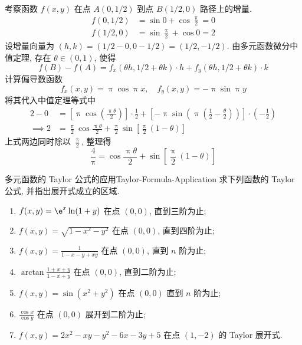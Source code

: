 \begin{myproof}
    考察函数 $f(x, y)$ 在点 $A(0, 1/2)$ 到点 $B(1/2, 0)$ 路径上的增量.
    \begin{equation}
        \begin{aligned}
            f(0, 1/2) & = \sin 0 + \cos \frac{\uppi}{2} = 0 \\
            f(1/2, 0) & = \sin \frac{\uppi}{2} + \cos 0 = 2
        \end{aligned}
    \end{equation}
    设增量向量为 $(h, k) = (1/2 - 0, 0 - 1/2) = (1/2, -1/2)$.
    由多元函数微分中值定理, 存在 $\theta \in (0, 1)$, 使得
    \begin{equation}
        f(B) - f(A) = f_{x}(\theta h, 1/2 + \theta k) \cdot h + f_{y}(\theta h, 1/2 + \theta k) \cdot k
    \end{equation}
    计算偏导数函数
    \begin{equation}
        f_{x}(x, y) = \uppi \cos \uppi x, \quad f_{y}(x, y) = -\uppi \sin \uppi y
    \end{equation}
    将其代入中值定理等式中
    \begin{equation}
        \begin{aligned}
            2 - 0      & = \left[ \uppi \cos \left( \frac{\uppi \theta}{2} \right) \right] \cdot \frac{1}{2} + \left[ -\uppi \sin \left( \uppi \left( \frac{1}{2} - \frac{\theta}{2} \right) \right) \right] \cdot \left( -\frac{1}{2} \right) \\
            \implies 2 & = \frac{\uppi}{2} \cos \frac{\uppi \theta}{2} + \frac{\uppi}{2} \sin \left[ \frac{\uppi}{2}(1 - \theta) \right]
        \end{aligned}
    \end{equation}
    上式两边同时除以 $\frac{\uppi}{2}$, 整理得
    \begin{equation}
        \frac{4}{\uppi} = \cos \frac{\uppi \theta}{2} + \sin \left[ \frac{\uppi}{2}(1 - \theta) \right]
    \end{equation}
\end{myproof}


\begin{problem}{多元函数的 Taylor 公式的应用}{Taylor-Formula-Application}
    求下列函数的 Taylor 公式, 并指出展开式成立的区域.
    \begin{enumerate}
        \item $f(x, y) = \e^x \ln(1+y)$ 在点 $(0, 0)$, 直到三阶为止;
        \item $f(x, y) = \sqrt{1 - x^2 - y^2}$ 在点 $(0, 0)$, 直到四阶为止;
        \item $f(x, y) = \frac{1}{1-x-y+xy}$ 在点 $(0, 0)$, 直到 $n$ 阶为止;
        \item $\arctan \frac{1+x+y}{1-x+y}$ 在点 $(0, 0)$, 直到二阶为止;
        \item $f(x, y) = \sin(x^2 + y^2)$ 在点 $(0, 0)$ 直到 $n$ 阶为止;
        \item $\frac{\cos x}{\cos y}$ 在点 $(0, 0)$ 展开到二阶为止;
        \item $f(x, y) = 2x^2 - xy - y^2 - 6x - 3y + 5$ 在点 $(1, -2)$ 的 Taylor 展开式.
    \end{enumerate}
\end{problem}

